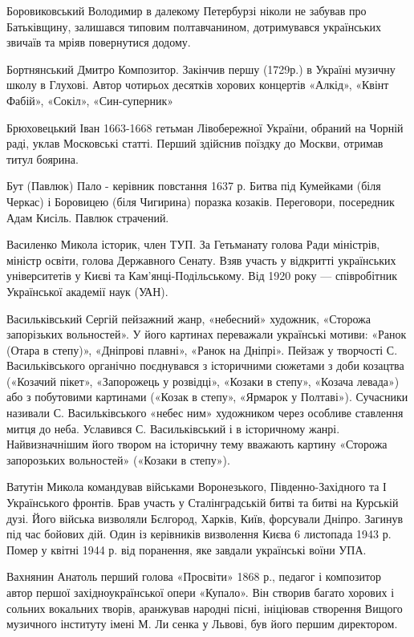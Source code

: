 Боровиковський   Володимир в далекому Петербурзі  ніколи не забував про Батьківщину, залишався типовим полтавчанином, дотримувався українських звичаїв та мріяв повернутися додому.

Бортнянський Дмитро  Композитор. Закінчив першу (1729р.) в Україні музичну школу в Глухові. Автор чотирьох десятків хорових концертів «Алкід», «Квінт Фабій», «Сокіл», «Син-суперник»

Брюховецький  Іван 1663-1668 гетьман Лівобережної України, обраний на Чорній раді, уклав Московські статті. Перший здійснив поїздку до Москви, отримав титул боярина.

Бут (Павлюк) Пало  - керівник повстання 1637 р. Битва під Кумейками (біля Черкас) і Боровицею (біля Чигирина) поразка козаків. Переговори, посередник Адам Кисіль. Павлюк страчений.

Василенко Микола історик, член ТУП. За Гетьманату голова Ради міністрів, міністр освіти, голова Державного Сенату. Взяв участь у відкритті українських університетів у Києві та Кам'янці-Подільському. Від 1920 року — співробітник Української академії наук (УАН). 

Васильківський Сергій пейзажний жанр, «небесний» художник, «Сторожа запорізьких вольностей». У його картинах переважали українські мотиви: «Ранок (Отара в степу)», «Дніпрові плавні», «Ранок на Дніпрі». Пейзаж у творчості С. Васильківського органічно поєднувався з історичними сюжетами з доби козацтва («Козачий пікет», «Запорожець у розвідці», «Козаки в степу», «Козача левада») або з побутовими картинами («Козак в степу», «Ярмарок у Полтаві»). Сучасники називали С. Васильківського «небес ним» художником через особливе ставлення митця до неба. Уславився С. Васильківський і в історичному жанрі. Найвизначнішим його твором на історичну тему вважають картину «Сторожа запорозьких вольностей» («Козаки в степу»).  

Ватутін Микола командував військами Воронезького, Південно-Західного та І Українського фронтів. Брав участь у Сталінградській битві та битві на Курській дузі. Його війська визволяли Бєлгород, Харків, Київ, форсували Дніпро. Загинув під час бойових дій. Один із керівників визволення Києва 6 листопада 1943 р. Помер у квітні 1944 р. від поранення, яке завдали українські воїни УПА.

Вахнянин Анатоль перший голова «Просвіти» 1868 р., педагог і композитор автор першої західноукраїнської опери «Купало». Він створив багато хорових і сольних вокальних творів, аранжував народні пісні, ініціював створення Вищого музичного інституту імені М. Ли сенка у Львові, був його першим директором.  

